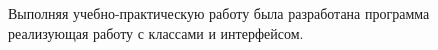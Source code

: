 \Conclusion

Выполняя учебно-практическую работу была разработана программа реализующая работу с классами и интерфейсом.
